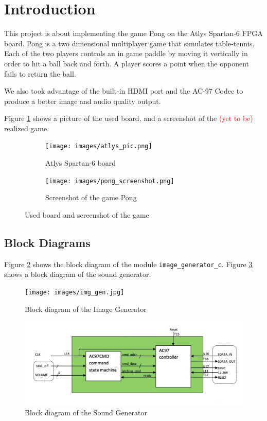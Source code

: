 \newpage
\section{Introduction}
	This project is about implementing the game Pong on the Atlys Spartan-6 FPGA board. Pong is a two dimensional multiplayer game that simulates table-tennis. Each of the two players controls an in game paddle by moving it vertically in order to hit a ball back and forth. A player scores a point when the opponent fails to return the ball. 
	
	We also took advantage of the built-in HDMI port and the AC-97 Codec to produce a better image and audio quality output. 
	
	Figure \ref{board+screenshot} shows a picture of the used board, and a screenshot of the \textcolor{red}{(yet to be)} realized game. 
	
	\begin{figure}[h]
		\begin{subfigure}[b]{.4\textwidth}
			\texttt{[image: images/atlys\_pic.png]}
			\caption{Atlys Spartan-6 board}
		\end{subfigure}
		\hfill
		\begin{subfigure}[b]{.4\textwidth}
			\texttt{[image: images/pong\_screenshot.png]}		
			\caption{Screenshot of the game Pong}
		\end{subfigure}
		
	\caption{Used board and screenshot of the game}
	\label{board+screenshot}
	\end{figure}
	
	\subsection{Block Diagrams}
		Figure \ref{img_gen} shows the block diagram of the module \texttt{image\_generator\_c}. Figure \ref{snd_gen} shows a block diagram of the sound generator. 
		
	\begin{figure}[here]
		\centering
		\texttt{[image: images/img\_gen.jpg]}
		\caption{Block diagram of the Image Generator}
		\label{img_gen}
	\end{figure}
	
	\begin{figure}[here]
		\centering
		\includegraphics[scale=0.5]{images/snd_gen.png}
		\caption{Block diagram of the Sound Generator}
		\label{snd_gen}
	\end{figure}
		
